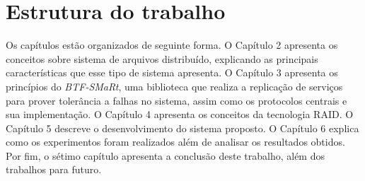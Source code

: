 
	\section{Estrutura do trabalho}
	
	Os capítulos estão organizados de seguinte forma. 
	O Capítulo 2 apresenta os conceitos sobre sistema de arquivos distribuído, explicando as principais características que esse tipo de sistema apresenta.  
	O Capítulo 3 apresenta os princípios do \textit{BTF-SMaRt}, uma biblioteca que realiza a replicação de serviços para prover tolerância a falhas no sistema, assim como os protocolos centrais e sua implementação.
	O Capítulo 4 apresenta os conceitos da tecnologia RAID.
	O Capítulo 5 descreve o desenvolvimento do sistema proposto.
	O Capítulo 6 explica como os experimentos foram realizados além de analisar os resultados obtidos.
	Por fim, o sétimo capítulo apresenta a conclusão deste trabalho, além dos trabalhos para futuro.